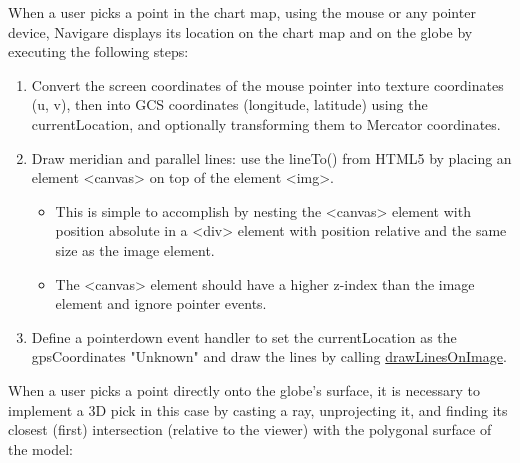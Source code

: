 \documentclass[conference]{IEEEtran}
\begin{document}
When a user picks a point in the chart map, using the mouse or any pointer device, Navigare displays its location on the chart map
and on the globe by executing the following steps:
\begin{enumerate}
    \item  Convert the screen coordinates of the mouse pointer into texture coordinates
    (u, v), then into GCS coordinates (longitude, latitude) using the currentLocation, and optionally transforming them to Mercator coordinates.
    \item  Draw meridian and parallel lines: use the lineTo() from HTML5 by placing an element <canvas> on top of the element <img>.
    \begin{itemize}
        \item This is simple to accomplish by nesting the <canvas> element with position
        absolute in a <div> element with position relative and the same size as the image element.
        \item The <canvas> element should have a higher z-index than the image element and ignore pointer events.
    \end{itemize}
    \item  Define a pointerdown event handler to set the currentLocation as the gpsCoordinates "Unknown"
    and draw the lines by calling \href{https://krotalias.github.io/cwdc/13-webgl/extras/doc-light/global.html#drawLinesOnImage}{drawLinesOnImage}.
\end{enumerate}
When a user picks a point directly onto the globe's surface, it is necessary to implement a
3D pick in this case by casting a ray, unprojecting it, and finding its closest (first) intersection
(relative to the viewer) with the polygonal surface of the model:
\end{document}
